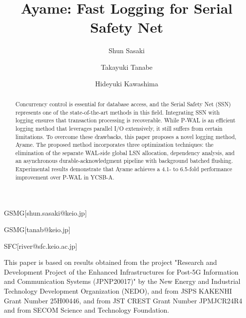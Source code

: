 \documentclass[english,preprint,JIP]{ipsj}
\begin{document}
\title{Ayame: Fast Logging for Serial Safety Net}


\author{Shun Sasaki}{GSMG}[shun.sasaki@keio.jp]
\author{Takayuki Tanabe}{GSMG}[tanab@keio.jp]
\author{Hideyuki Kawashima}{SFC}[river@sfc.keio.ac.jp]

\begin{abstract}
Concurrency control is essential for database access, and the Serial Safety Net (SSN) represents one of the state-of-the-art methods in this field. Integrating SSN with logging ensures that transaction processing is recoverable. While P-WAL is an efficient logging method that leverages parallel I/O extensively, it still suffers from certain limitations. To overcome these drawbacks, this paper proposes a novel logging method, Ayame. The proposed method incorporates three optimization techniques: the elimination of the separate WAL-side global LSN allocation, dependency analysis, and an asynchronous durable-acknowledgment pipeline with background batched flushing. Experimental results demonstrate that Ayame achieves a 4.1- to 6.5-fold performance improvement over P-WAL in YCSB-A.
\end{abstract}

\maketitle








\begin{acknowledgment}
This paper is based on results obtained from the project "Research and Development Project of the Enhanced Infrastructures for Post-5G Information and Communication Systems (JPNP20017)" by the New Energy and Industrial Technology Development Organization (NEDO), and from JSPS KAKENHI Grant Number 25H00446, and from JST CREST Grant Number JPMJCR24R4 and from SECOM Science and Technology Foundation.

\end{acknowledgment}



\end{document}
